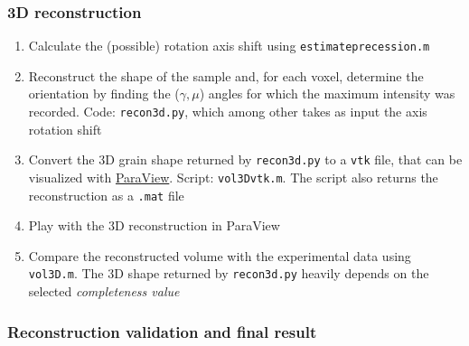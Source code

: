 \documentclass[11pt]{scrartcl}
\begin{document}
\subsubsection{3D reconstruction}    
    
\begin{enumerate}
    \item Calculate the (possible) rotation axis shift using {\texttt{estimate\textunderscore precession.m}}
    \item Reconstruct the shape of the sample and, for each voxel, determine the orientation by finding the ($\gamma, \mu$) angles for which the maximum intensity was recorded. Code: {\texttt{recon3d.py}}, which among other takes as input the axis rotation shift 
    \item Convert the {\footnotesize{3D}} grain shape returned by {\texttt{recon3d.py}} to a {\texttt{vtk}} file, that can be visualized with \href{https://www.paraview.org/}{ParaView}. Script: {\texttt{vol3D\textunderscore vtk.m}}. The script also returns the reconstruction as a {\texttt{.mat}} file
    \item Play with the {\footnotesize{3D}} reconstruction in ParaView
    \item Compare the reconstructed volume with the experimental data using {\texttt{vol3D.m}}. The {\footnotesize{3D}} shape returned by {\texttt{recon3d.py}} heavily depends on the selected {\emph{completeness value}}
\end{enumerate}  

\subsubsection{Reconstruction validation and final result}
\end{document}
